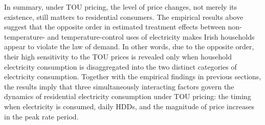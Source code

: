 In summary, under TOU pricing, the level of price changes, not merely its existence, still matters to residential consumers. The empirical results above suggest that the opposite order in estimated treatment effects between non-temperature- and temperature-control uses of electricity makes Irish households appear to violate the law of demand. In other words, due to the opposite order, their high sensitivity to the TOU prices is revealed only when household electricity consumption is disaggregated into the two distinct categories of electricity consumption. Together with the empirical findings in previous sections, the results imply that three simultaneously interacting factors govern the dynamics of residential electricity consumption under TOU pricing: the timing when electricity is consumed, daily HDDs, and the magnitude of price increases in the peak rate period. 

